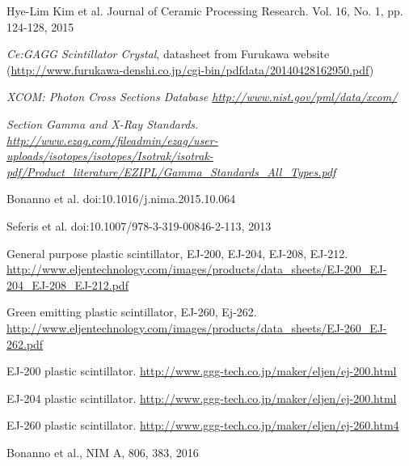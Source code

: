 \documentclass[10pt,a4paper, openany]{book}
\begin{document}
\clearpage
{}
\begin{thebibliography}{20}

Hye-Lim Kim et al. Journal of Ceramic Processing Research. Vol. 16, No. 1, pp. 124-128, 2015

\emph{Ce:GAGG Scintillator Crystal}, datasheet from Furukawa website (\url{http://www.furukawa-denshi.co.jp/cgi-bin/pdfdata/20140428162950.pdf})

\emph{XCOM: Photon Cross Sections Database \url{http://www.nist.gov/pml/data/xcom/}}

\emph{Section Gamma and X-Ray Standards. \url{http://www.ezag.com/fileadmin/ezag/user-uploads/isotopes/isotopes/Isotrak/isotrak-pdf/Product_literature/EZIPL/Gamma_Standards_All_Types.pdf}}

Bonanno et al. doi:10.1016/j.nima.2015.10.064

Seferis et al. doi:10.1007/978-3-319-00846-2-113, 2013

General purpose plastic scintillator, EJ-200, EJ-204, EJ-208, EJ-212. \url{http://www.eljentechnology.com/images/products/data_sheets/EJ-200_EJ-204_EJ-208_EJ-212.pdf}

Green emitting plastic scintillator, EJ-260, Ej-262. \url{http://www.eljentechnology.com/images/products/data_sheets/EJ-260_EJ-262.pdf}

EJ-200 plastic scintillator. \url{http://www.ggg-tech.co.jp/maker/eljen/ej-200.html}

EJ-204 plastic scintillator. \url{http://www.ggg-tech.co.jp/maker/eljen/ej-200.html}

EJ-260 plastic scintillator. \url{http://www.ggg-tech.co.jp/maker/eljen/ej-260.htm4}

Bonanno et al., NIM A, 806, 383, 2016

\end{thebibliography}
\end{document}
